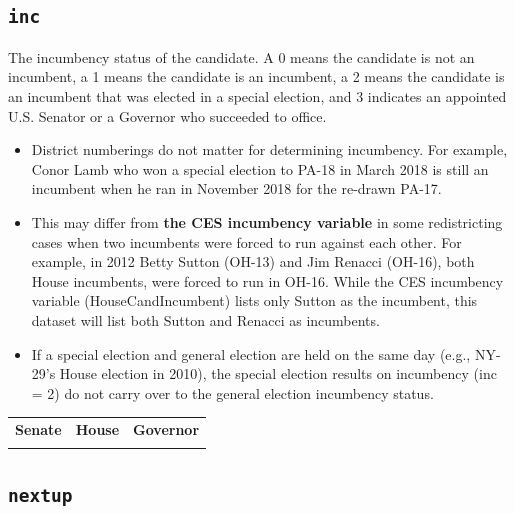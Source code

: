 \documentclass[12pt]{article}
\begin{document}
\twocolumn
\begin{adjustwidth}{-2em}{-2em}
\centering
{\scriptsize

}
\end{adjustwidth}

\onecolumn



\subsection*{\texttt{inc}}

The incumbency status of the candidate. A 0 means the candidate is not an incumbent, a 1 means the candidate is an incumbent, a 2 means the candidate is an incumbent that was elected in a special election, and 3 indicates an appointed U.S. Senator or a Governor who succeeded to office.
\begin{itemize}
\item District numberings do not matter for determining incumbency. For example, Conor Lamb who won a special election to PA-18 in March 2018 is still an incumbent when he ran in November 2018 for the re-drawn PA-17.
\item This may differ from \textbf{the CES incumbency variable} in some redistricting cases when two incumbents were forced to run against each other. For example, in 2012 Betty Sutton (OH-13) and Jim Renacci (OH-16), both House incumbents, were forced to run in OH-16. While the CES incumbency variable (HouseCandIncumbent) lists only Sutton as the incumbent, this dataset will list both Sutton and Renacci as incumbents.
\item If a special election and general election are held on the same day (e.g., NY-29's House election in 2010), the special election results on incumbency (inc = 2) do not carry over to the general election incumbency status.
\end{itemize}

    \begin{tabularx}{\linewidth}{CCC}
    \textbf{Senate} & \textbf{House} & \textbf{Governor}\\
     &  & 
    \end{tabularx}


\FloatBarrier


\subsection*{\texttt{nextup}}
\end{document}
